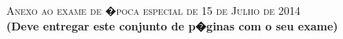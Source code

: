 \documentclass{docist}
\begin{document}
\thispagestyle{empty}

\begin{center}
  {\Large \textsc{Anexo ao exame de �poca especial de 15 de Julho de 2014\\[2ex]}}
  {\normalsize  \textbf{(Deve entregar este conjunto de p�ginas com o seu exame)}}
\end{center}





\qGPCarbonBufferInterfaceEE

\qGPCarbonRelayEE

\qGPWhisperViewTypeEE

\qMWLowCostEE

\qMWReliabilityImplementationEE

\qMWQualitiesEE

\qMWReliabilityReadsImplementationEE

\qMWResourceLoaderTacticEE

\qCHQualitiesEE

\qCHPerformanceQualityEE

\qCHPrerenderTacticsEE

\qCHOmniboxTacticsEE

\qCHAmazonSilkTwoEE

\qCHMobilityArchitecturalStyleEE

\qGMPicklePerformanceEE

\qGMPerformanceEE

\qGMRestModularityEE

\qGMReliabilityFIFOEE

\qGMMessagesPersistenceEE

\qGMMasterRunnerEE

\qFirstEE

\qSecondEE

\qThirdEE

\qFourthEE

\qFifthEE

\qSixthEE

\qSeventhEE

\qEighthEE

\qNinethEE

\qTenthEE
\end{document}
